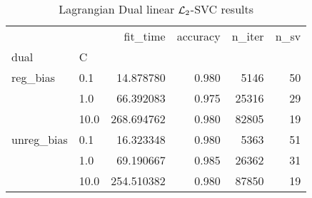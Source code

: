 \begin{table}[H]
\centering
\caption{Lagrangian Dual linear $\protect \mathcal{L}_2$-SVC results}
\label{linear_lagrangian_dual_l2_svc_cv_results}
\begin{tabular}{llrrrr}
\toprule
           &      &    fit\_time &  accuracy &  n\_iter &  n\_sv \\
dual & C &             &           &         &       \\
\midrule
reg\_bias & 0.1  &   14.878780 &     0.980 &    5146 &    50 \\
           & 1.0  &   66.392083 &     0.975 &   25316 &    29 \\
           & 10.0 &  268.694762 &     0.980 &   82805 &    19 \\
unreg\_bias & 0.1  &   16.323348 &     0.980 &    5363 &    51 \\
           & 1.0  &   69.190667 &     0.985 &   26362 &    31 \\
           & 10.0 &  254.510382 &     0.980 &   87850 &    19 \\
\bottomrule
\end{tabular}
\end{table}
